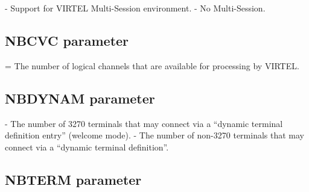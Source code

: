 \documentclass[letterpaper,10pt,english]{sphinxmanual}
\begin{document}
 - Support for VIRTEL Multi-Session environment.
 - No Multi-Session.


\subsection{NBCVC parameter}
\label{\detokenize{Installation_Guide:index-92}}\label{\detokenize{Installation_Guide:nbcvc-parameter}}
\begin{sphinxVerbatim}[commandchars=\\\{\}]
 
\end{sphinxVerbatim}

 = The number of logical channels that are available for processing by VIRTEL.


\subsection{NBDYNAM parameter}
\label{\detokenize{Installation_Guide:nbdynam-parameter}}\label{\detokenize{Installation_Guide:index-93}}
\begin{sphinxVerbatim}[commandchars=\\\{\}]
 
\end{sphinxVerbatim}

 - The number of 3270 terminals that may connect via a “dynamic terminal definition entry” (welcome mode).
 - The number of non-3270 terminals that may connect via a “dynamic terminal definition”.


\subsection{NBTERM parameter}
\label{\detokenize{Installation_Guide:nbterm-parameter}}\label{\detokenize{Installation_Guide:index-94}}
\begin{sphinxVerbatim}[commandchars=\\\{\}]
 
\end{sphinxVerbatim}
\end{document}
